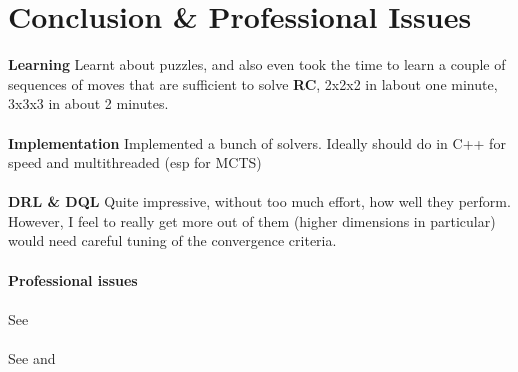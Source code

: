 
\chapter{Conclusion \& Professional Issues} %

\label{Conclusion} %



\textbf{Learning}
Learnt about puzzles, and also even took the time to learn a couple of sequences of moves that are sufficient to solve \textbf{RC}, 2x2x2 in labout one minute, 3x3x3 in about 2 minutes.
\\
\\
\textbf{Implementation}
Implemented a bunch of solvers. Ideally should do in C++ for speed and multithreaded (esp for MCTS)
\\
\\
\textbf{DRL \& DQL}
Quite impressive, without too much effort, how well they perform. However, I feel to really get more out of them (higher dimensions in particular) would need careful tuning of the convergence criteria.
\\
\\
\textbf{Professional issues}
\\
\\
See \cite{ManyWorlds}
\\
\\
See \cite{https://doi.org/10.1111/1758-5899.12718} and \cite{Bostrom2014}
